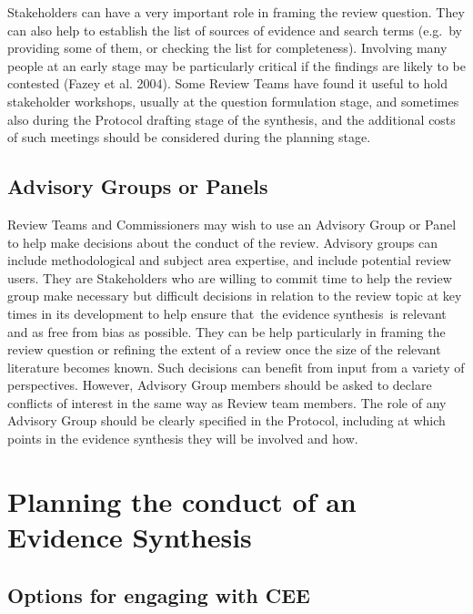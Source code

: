 \documentclass[
  letterpaper,
  DIV=11,
  numbers=noendperiod]{scrreprt}
\begin{document}
Stakeholders can have a very important role in framing the review
question. They can also help to establish the list of sources of
evidence and search terms (e.g.~by providing some of them, or checking
the list for completeness). Involving many people at an early stage may
be particularly critical if the findings are likely to be contested
(Fazey et al. 2004). Some Review Teams have found it useful to hold
stakeholder workshops, usually at the question formulation stage, and
sometimes also during the Protocol drafting stage of the synthesis, and
the additional costs of such meetings should be considered during the
planning stage.

\section{\texorpdfstring{\textbf{Advisory Groups or
Panels}}{Advisory Groups or Panels}}\label{advisory-groups-or-panels}

Review Teams and Commissioners may wish to use an Advisory Group or
Panel to help make decisions about the conduct of the review. Advisory
groups can include methodological and subject area expertise, and
include potential review users. They are Stakeholders who are willing to
commit time to help the review group make necessary but difficult
decisions in relation to the review topic at key times in its
development to help ensure that~the evidence synthesis~is relevant and
as free from bias as possible. They can be help particularly in framing
the review question or refining the extent of a review once the size of
the relevant literature becomes known. Such decisions can benefit from
input from a variety of perspectives. However, Advisory Group members
should be asked to declare conflicts of interest in the same way as
Review team members. The role of any Advisory Group should be clearly
specified in the Protocol, including at which points in the evidence
synthesis they will be involved and how.


\chapter{Planning the conduct of an Evidence
Synthesis}\label{sec-chapt3}

\section{\texorpdfstring{\textbf{Options for engaging with
CEE}}{Options for engaging with CEE}}\label{sec-engage}
\end{document}
